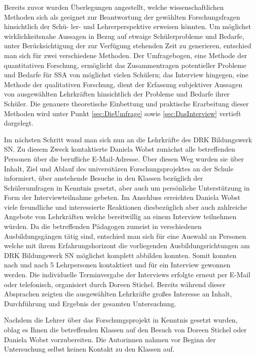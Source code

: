 Bereits zuvor wurden Überlegungen angestellt, welche wissenschaftlichen Methoden sich als geeignet zur Beantwortung der gewählten Forschungsfragen hinsichtlich der Schü- ler- und  Lehrerperspektive erweisen könnten. Um möglichst wirklichkeitsnahe Aussagen in Bezug auf etwaige Schülerprobleme und Bedarfe, unter Berücksichtigung der zur Verfügung stehenden Zeit zu generieren, entschied man sich für zwei verschiedene Methoden. Der Umfragebogen, eine Methode der quantitativen Forschung, ermöglicht das Zusammentragen potentieller Probleme und Bedarfe für SSA von möglichst vielen Schülern; das Interview hingegen, eine Methode der qualitativen Forschung, dient der Erfassung subjektiver Aussagen von ausgewählten Lehrkräften hinsichtlich der Probleme und Bedarfe ihrer Schüler. Die genauere theoretische Einbettung und praktische Erarbeitung dieser Methoden wird unter Punkt \ref{sec:DieUmfrage} sowie \ref{sec:DasInterview} vertieft dargelegt.

Im nächsten Schritt wand man sich nun an die Lehrkräfte des DRK Bildungswerk SN. Zu diesem Zweck kontaktierte Daniela Wobst zunächst alle betreffenden Personen über die berufliche E-Mail-Adresse. Über diesen Weg wurden sie über Inhalt, Ziel und Ablauf des universitären Forschungsprojektes an der Schule informiert, über anstehende Besuche in den Klassen bezüglich der Schülerumfragen in Kenntnis gesetzt, aber auch um persönliche Unterstützung in Form der Interviewteilnahme gebeten. Im Anschluss erreichten Daniela Wobst viele freundliche und interessierte Reaktionen diesbezüglich aber auch zahlreiche Angebote von Lehrkräften welche bereitwillig an einem Interview teilnehmen würden. Da die betreffenden Pädagogen zumeist in verschiedenen Ausbildungsgängen tätig sind, entschied man sich für eine Auswahl an Personen welche mit ihrem Erfahrungshorizont die vorliegenden Ausbildungsrichtungen am DRK Bildungswerk SN möglichst komplett abbilden konnten. Somit konnten nach und nach 5 Lehrpersonen kontaktiert und für ein Interview gewonnen werden. Die individuelle Terminvergabe der Interviews erfolgte erneut per E-Mail oder telefonisch, organisiert durch Doreen Stichel. Bereits während dieser Absprachen zeigten die ausgewählten Lehrkräfte großes Interesse an Inhalt, Durchführung und Ergebnis der gesamten Untersuchung.

Nachdem die Lehrer über das Forschungsprojekt in Kenntnis gesetzt wurden, oblag es Ihnen die betreffenden Klassen auf den Besuch von Doreen Stichel oder Daniela Wobst vorzubereiten. Die Autorinnen nahmen vor Beginn der Untersuchung selbst keinen Kontakt zu den Klassen auf.

